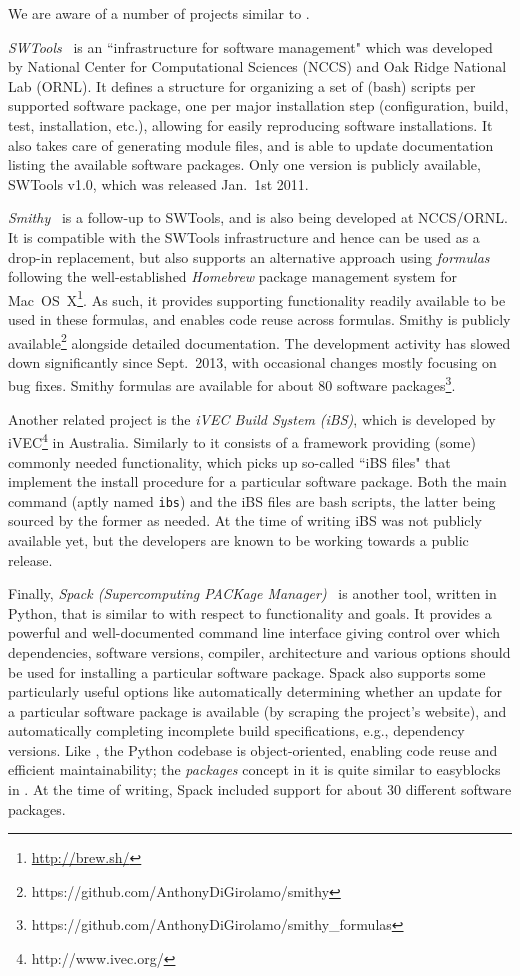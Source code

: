 We are aware of a number of projects similar to \easybuild{}.

\emph{SWTools}~\cite{swtools, jones08} is an ``infrastructure for software
management" which was developed by National Center for Computational Sciences (NCCS)
and Oak Ridge National Lab (ORNL). It defines a structure for organizing a set of
(bash) scripts per supported software package, one per major installation step
(configuration, build, test, installation, etc.), allowing for easily reproducing 
software installations. It also takes care of generating module files, and is
able to update documentation listing the available software packages.
Only one version is publicly available, SWTools v1.0, which was released Jan.~1st 2011.

\emph{Smithy}~\cite{smithy} is a follow-up to SWTools, and is also being developed
at NCCS/ORNL. It is compatible with the SWTools infrastructure and hence can be
used as a drop-in replacement, but also supports an alternative approach using
\emph{formulas} following the well-established \emph{Homebrew} package management 
system for Mac~OS~X\footnote{\url{http://brew.sh/}}. As such, it provides
supporting functionality readily available to be used in these formulas, and enables
code reuse across formulas. Smithy is publicly
available\footnote{https://github.com/AnthonyDiGirolamo/smithy} alongside detailed
documentation. The development activity has slowed down significantly since
Sept.~2013, with occasional changes mostly focusing on bug fixes.
Smithy formulas are available for about 80 software
packages\footnote{https://github.com/AnthonyDiGirolamo/smithy\_formulas}.

Another related project is the \emph{iVEC Build System (iBS)}, which is developed 
by iVEC\footnote{http://www.ivec.org/} in Australia. Similarly to \easybuild{}
it consists of a framework providing (some) commonly needed functionality, which
picks up so-called ``iBS files" that implement the install procedure for a 
particular software package. Both the main command (aptly named
\texttt{\small ibs}) and the iBS files are bash scripts, the latter being sourced by
the former as needed. At the time of writing iBS was not publicly available yet, but
the developers are known to be working towards a public release.

Finally, \emph{Spack (Supercomputing PACKage Manager)}~\cite{spack} is another
tool, written in Python, that is similar to \easybuild{} with respect to functionality and
goals. It provides a powerful and well-documented command line interface giving
control over which dependencies, software versions, compiler, architecture and
various options should be used for installing a particular software package.
Spack also supports some particularly useful options like automatically determining
whether an update for a particular software package is available
(by scraping the project's website), and automatically completing
incomplete build specifications, e.g., dependency versions. Like
\easybuild{}, the Python codebase is object-oriented, enabling code reuse and
efficient maintainability; the \emph{packages} concept in it is quite similar to
easyblocks in \easybuild{}. At the time of writing, Spack included support for about
30 different software packages.

